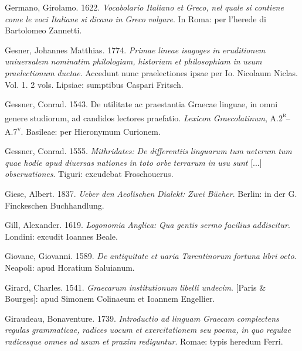 \documentclass[output=paper]{langsci/langscibook}
\begin{document}
Germano, Girolamo. 1622. \textit{Vocabolario} \textit{Italiano} \textit{et} \textit{Greco,} \textit{nel} \textit{quale} \textit{si} \textit{contiene} \textit{come} \textit{le} \textit{voci} \textit{Italiane} \textit{si} \textit{dicano} \textit{in} \textit{Greco} \textit{volgare}. In Roma: per l’herede di Bartolomeo Zannetti.

Gesner, Johannes Matthias. 1774. \textit{Primae} \textit{lineae} \textit{isagoges} \textit{in} \textit{eruditionem} \textit{uniuersalem} \textit{nominatim} \textit{philologiam,} \textit{historiam} \textit{et} \textit{philosophiam} \textit{in} \textit{usum} \textit{praelectionum} \textit{ductae}. Accedunt nunc praelectiones ipsae per Io. Nicolaum Niclas. Vol. 1. 2 vols. Lipsiae: sumptibus Caspari Fritsch.

Gessner, Conrad. 1543. De utilitate ac praestantia Graecae linguae, in omni genere studiorum, ad candidos lectores praefatio. \textit{Lexicon} \textit{Graecolatinum}, A.2\textsc{\textsuperscript{r}}–A.7\textsc{\textsuperscript{v}}. Basileae: per Hieronymum Curionem.

Gessner, Conrad. 1555. \textit{Mithridates:} \textit{De} \textit{differentiis} \textit{linguarum} \textit{tum} \textit{ueterum} \textit{tum} \textit{quae} \textit{hodie} \textit{apud} \textit{diuersas} \textit{nationes} \textit{in} \textit{toto} \textit{orbe} \textit{terrarum} \textit{in} \textit{usu} \textit{sunt} [...] \textit{obseruationes}. Tiguri: excudebat Froschouerus.

Giese, Albert. 1837. \textit{Ueber} \textit{den} \textit{Aeolischen} \textit{Dialekt:} \textit{Zwei} \textit{Bücher}. Berlin: in der G. Finckeschen Buchhandlung.

Gill, Alexander. 1619. \textit{Logonomia} \textit{Anglica:} \textit{Qua} \textit{gentis} \textit{sermo} \textit{facilius} \textit{addiscitur}. Londini: excudit Ioannes Beale.

Giovane, Giovanni. 1589. \textit{De} \textit{antiquitate} \textit{et} \textit{uaria} \textit{Tarentinorum} \textit{fortuna} \textit{libri} \textit{octo}. Neapoli: apud Horatium Saluianum.

Girard, Charles. 1541. \textit{Graecarum} \textit{institutionum} \textit{libelli} \textit{undecim}. [Paris \& Bourges]: apud Simonem Colinaeum et Ioannem Engellier.

Giraudeau, Bonaventure. 1739. \textit{Introductio} \textit{ad} \textit{linguam} \textit{Graecam} \textit{complectens} \textit{regulas} \textit{grammaticae,} \textit{radices} \textit{uocum} \textit{et} \textit{exercitationem} \textit{seu} \textit{poema,} \textit{in} \textit{quo} \textit{regulae} \textit{radicesque} \textit{omnes} \textit{ad} \textit{usum} \textit{et} \textit{praxim} \textit{rediguntur}. Romae: typis heredum Ferri.
\end{document}
